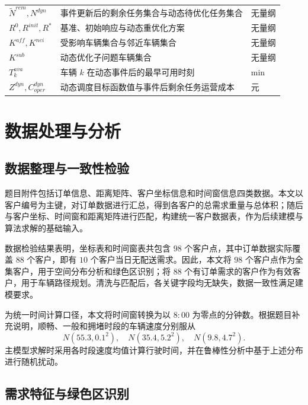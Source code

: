 \documentclass[withoutpreface,bwprint]{cumcmthesis} %
\begin{document}
\begin{xltabular}{0.95\textwidth}{>{\centering\arraybackslash}m{2.6cm}X>{\centering\arraybackslash}m{2.0cm}}
$\widetilde N^{rem},N^{dyn}$ & 事件更新后的剩余任务集合与动态待优化任务集合 & 无量纲 \\

$R^0,R^{init},R^*$ & 基准、初始响应与动态重优化方案 & 无量纲 \\

$K^{aff},K^{nei}$ & 受影响车辆集合与邻近车辆集合 & 无量纲 \\
$K^{sub}$ & 动态优化子问题车辆集合 & 无量纲 \\

$T_k^{ava}$ & 车辆 $k$ 在动态事件后的最早可用时刻 & min \\
$Z^{dyn},C^{dyn}_{oper}$ & 动态调度目标函数值与事件后剩余任务运营成本 & 元 \\

\end{xltabular}

\endgroup


\section{数据处理与分析}

\subsection{数据整理与一致性检验}

题目附件包括订单信息、距离矩阵、客户坐标信息和时间窗信息四类数据。本文以客户编号为主键，对订单数据进行汇总，得到各客户的总需求重量与总体积；随后与客户坐标、时间窗和距离矩阵进行匹配，构建统一客户数据表，作为后续建模与算法求解的基础输入。

数据检验结果表明，坐标表和时间窗表共包含 $98$ 个客户点，其中订单数据实际覆盖 $88$ 个客户，即有 $10$ 个客户当日无配送需求。因此，本文将 $98$ 个客户点作为全集客户，用于空间分布分析和绿色区识别；将 $88$ 个有订单需求的客户作为有效客户，用于车辆路径规划。清洗与匹配后，各关键字段均无缺失，数据一致性满足建模要求。

为统一时间计算口径，本文将时间窗转换为以 $8{:}00$ 为零点的分钟数。根据题目补充说明，顺畅、一般和拥堵时段的车辆速度分别服从
\[
N(55.3,0.1^2),\quad N(35.4,5.2^2),\quad N(9.8,4.7^2).
\]
主模型求解时采用各时段速度均值计算行驶时间，并在鲁棒性分析中基于上述分布进行随机扰动。

\subsection{需求特征与绿色区识别}
\end{document}
